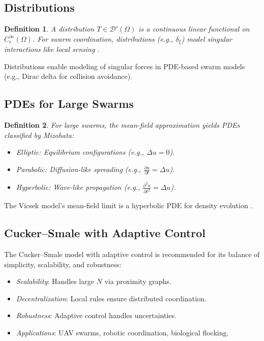 \documentclass{article}
\theoremstyle{plain}
\newtheorem{definition}{Definition}[section]
\begin{document}
\subsection{Distributions}

\begin{definition}
A \emph{distribution} \(T \in \mathcal{D}'(\Omega)\) is a continuous linear functional on \(C^\infty_c(\Omega)\). For swarm coordination, distributions (e.g., \(\delta_\xi\)) model singular interactions like local sensing \cite{nLab_distributions}.
\end{definition}

Distributions enable modeling of singular forces in PDE-based swarm models (e.g., Dirac delta for collision avoidance).

\subsection{PDEs for Large Swarms}

\begin{definition}
For large swarms, the mean-field approximation yields PDEs classified by Mizohata:
\begin{itemize}
    \item \emph{Elliptic}: Equilibrium configurations (e.g., \(\Delta u = 0\)).
    \item \emph{Parabolic}: Diffusion-like spreading (e.g., \(\frac{\partial u}{\partial t} = \Delta u\)).
    \item \emph{Hyperbolic}: Wave-like propagation (e.g., \(\frac{\partial^2 u}{\partial t^2} = \Delta u\)).
\end{itemize}
\end{definition}

The Vicsek model’s mean-field limit is a hyperbolic PDE for density evolution \cite{vicsek_model}.

\subsection{Cucker--Smale with Adaptive Control}

The Cucker--Smale model with adaptive control is recommended for its balance of simplicity, scalability, and robustness:
\begin{itemize}
    \item \emph{Scalability}: Handles large \(N\) via proximity graphs.
    \item \emph{Decentralization}: Local rules ensure distributed coordination.
    \item \emph{Robustness}: Adaptive control handles uncertainties.
    \item \emph{Applications}: UAV swarms, robotic coordination, biological flocking.
\end{itemize}
\end{document}
